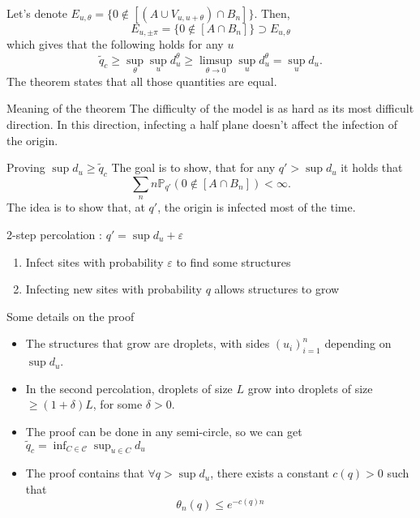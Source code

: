 \begin{frame}
	Let's denote $E_{u, \theta} = \{0\not\in [(A\cup V_{u, u+\theta})\cap B_n]\}$. Then,
	\begin{equation*}
		E_{u, \pm\pi} = \{ 0 \not\in [A\cap B_n]\} \supset E_{u, \theta}
	\end{equation*}
	which gives that the following holds for any $u$
	\begin{equation*}
		\tilde q_c \geq \sup_\theta \sup_u d_u^\theta \geq \limsup_{\theta\to 0} \sup_u d_u^\theta = \sup_u d_u.
	\end{equation*}
	The theorem states that all those quantities are equal. 
	\begin{block}{Meaning of the theorem}
		The difficulty of the model is as hard as its most difficult direction. In this direction, infecting a half plane doesn't affect the infection of the origin.
	\end{block}
\end{frame}

\begin{frame}{Proving $\sup d_u \geq \tilde q_c$}
	The goal is to show, that for any $q'>\sup d_u$ it holds that
	\begin{equation*}
		\sum_n n \mathbb{P}_{q'}(0\not\in[A\cap B_n]) < \infty.
	\end{equation*}
	The idea is to show that, at $q'$, the origin is infected most of the time.
	\begin{block}{2-step percolation : $q' = \sup d_u + \varepsilon$}
		\begin{enumerate}
			\item Infect sites with probability $\varepsilon$ to find some structures
			\item Infecting new sites with probability $q$ allows structures to grow
		\end{enumerate}
	\end{block}
\end{frame}

\begin{frame}{Some details on the proof}
	\begin{itemize}
		\item The structures that grow are droplets, with sides $(u_i)_{i=1}^n$ depending on $\sup d_u$.
		\item In the second percolation, droplets of size $L$ grow into droplets of size $\geq (1+\delta)L$, for some $\delta > 0$.
		\item The proof can be done in any semi-circle, so we can get $\tilde q_c = \inf_{C\in\mathcal{C}}\sup_{u\in C} d_u$
		\item The proof contains that $\forall q> \sup d_u$, there exists a constant $c(q)>0$ such that
			\begin{equation*}
				\theta_n(q) \leq e^{-c(q)n}
			\end{equation*}
	\end{itemize}
\end{frame}

